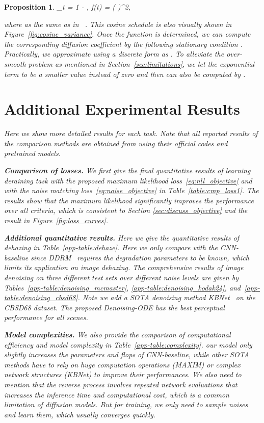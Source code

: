 \documentclass{article}
\theoremstyle{plain}
\newtheorem{proposition}[theorem]{Proposition}
\theoremstyle{definition}
\theoremstyle{remark}
\begin{document}
\begin{proposition}
    \theta_t = 1 - , \quad f(t) = \cos \left(  \cdot {} \right)^2,

where  as the same as in ~\cite{nichol2021improved}. This cosine  schedule is also visually shown in Figure~\ref{fig:cosine_variance}. Once the  function is determined, we can compute the corresponding diffusion coefficient  by the following stationary condition .
Practically, we approximate  using a discrete form as . To alleviate the over-smooth problem as mentioned in Section~\ref{sec:limitations}, we let the exponential term  to be a smaller value  instead of zero and then  can also be computed by . 


\section{Additional Experimental Results}
\label{app-sec:results}

Here we show more detailed results for each task. Note that all reported results of the comparison methods are obtained from using their official codes and pretrained models.

\textbf{Comparison of losses.}
We first give the final quantitative results of learning deraining task with the proposed maximum likelihood loss~\eqref{eq:nll_objective} and with the noise matching loss~\eqref{eq:noise_objective} in Table~\ref{table:cmp_loss1}. The results show that the maximum likelihood significantly improves the performance over all criteria, which is consistent to Section \ref{sec:discuss_objective} and the result in Figure~\ref{fig:loss_curves}. 

\textbf{Additional quantitative results.}
Here we give the quantitative results of dehazing in Table~\ref{app-table:dehaze}. Here we only compare with the CNN-baseline since DDRM~\cite{kawar2022denoising} requires the degradation parameters to be known, which limits its application on image dehazing.
The comprehensive results of image denoising on three different test sets over different noise levels are given by Tables~\ref{app-table:denoising_mcmaster}, \ref{app-table:denoising_kodak24}, and~\ref{app-table:denoising_cbsd68}. Note we add a SOTA denoising method KBNet~\cite{zhang2023kbnet} on the CBSD68 dataset. The proposed Denoising-ODE has the best perceptual performance for all scenes. 

\textbf{Model complexities.}
We also provide the comparison of computational efficiency and model complexity in Table~\ref{app-table:complexity}. our model only slightly increases the parameters and flops of CNN-baseline, while other SOTA methods have to rely on huge computation operations (MAXIM) or complex network structures (KBNet) to improve their performances. We also need to mention that the reverse process involves repeated network evaluations that increases the inference time and computational cost, which is a common limitation of diffusion models. But for training, we only need to sample noises and learn them, which usually converges quickly. 


\end{proposition}
\end{document}
